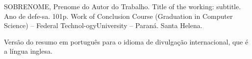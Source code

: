 SOBRENOME, Prenome do Autor do Trabalho. Title of the working: subtitle. Ano de defe-sa. 101p. Work of Conclusion Course (Graduation in Computer Science) – Federal Technol-ogyUniversity – Paraná. Santa Helena. 

Versão do resumo em português para o idioma de divulgação internacional, que é a língua inglesa. 

